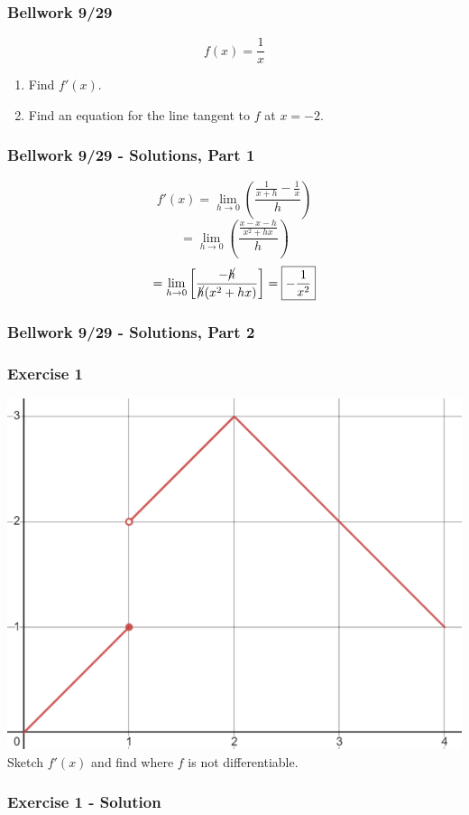 \documentclass[12pt]{beamer}
\begin{document}
\begin{frame}
	\frametitle{Bellwork 9/29}
	\initclock

	\Large
	\[f(x) = \frac{1}{x}\]
	\begin{enumerate}\itemsep2ex %
		\item Find $f'(x)$.
		\item Find an equation for the line tangent to $f$ at $x=-2$.
	\end{enumerate}
	\vfill
	\vfill

	\small
	\crono
\end{frame}
\begin{frame}
	\frametitle{Bellwork 9/29 - Solutions, Part 1}

	\large
	\[f'(x) = \displaystyle\lim_{h\to 0}\left(\frac{\frac{1}{x+h}-\frac{1}{x}}{h}\right)\]
	\[=\displaystyle\lim_{h\to 0}\left(\frac{\frac{x-x-h}{x^2+hx}}{h}\right)\]
	\[=\displaystyle\lim_{h\to 0}\left[\frac{-\cancel{h}}{\cancel{h}(x^2+hx)}\right]=\boxed{-\frac{1}{x^2}}\]
\end{frame}
\begin{frame}
	\frametitle{Bellwork 9/29 - Solutions, Part 2}

\end{frame}
\begin{frame}
	\frametitle{Exercise 1}

	\begin{center}
		\vfill
		\includegraphics[scale=0.5]{exercise_1_graph.png}
		\vfill
		Sketch $f'(x)$ and find where $f$ is not differentiable.
		\vfill
	\end{center}
\end{frame}
\begin{frame}
	\frametitle{Exercise 1 - Solution}

\end{frame}
\end{document}

